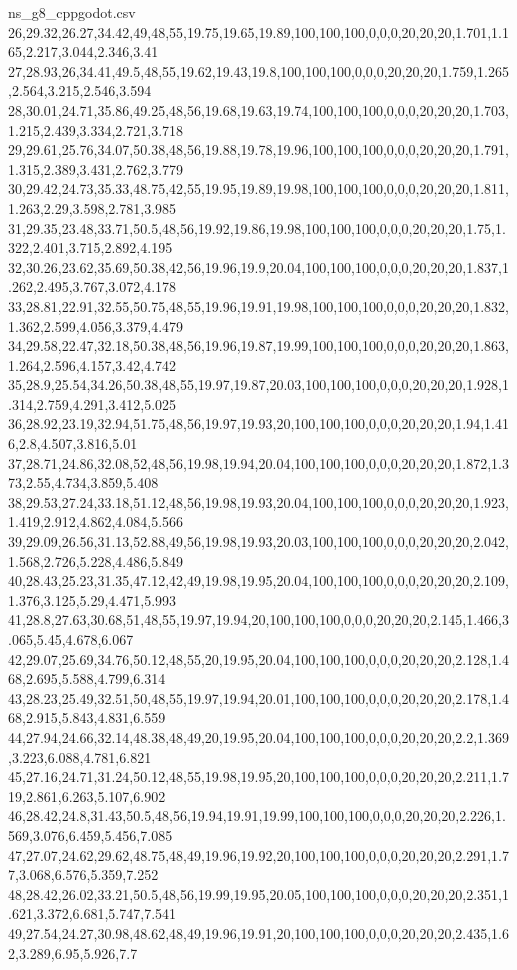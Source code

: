 \begin{filecontents*}[overwrite]{ns_g8_cppgodot.csv}
26,29.32,26.27,34.42,49,48,55,19.75,19.65,19.89,100,100,100,0,0,0,20,20,20,1.701,1.165,2.217,3.044,2.346,3.41
27,28.93,26,34.41,49.5,48,55,19.62,19.43,19.8,100,100,100,0,0,0,20,20,20,1.759,1.265,2.564,3.215,2.546,3.594
28,30.01,24.71,35.86,49.25,48,56,19.68,19.63,19.74,100,100,100,0,0,0,20,20,20,1.703,1.215,2.439,3.334,2.721,3.718
29,29.61,25.76,34.07,50.38,48,56,19.88,19.78,19.96,100,100,100,0,0,0,20,20,20,1.791,1.315,2.389,3.431,2.762,3.779
30,29.42,24.73,35.33,48.75,42,55,19.95,19.89,19.98,100,100,100,0,0,0,20,20,20,1.811,1.263,2.29,3.598,2.781,3.985
31,29.35,23.48,33.71,50.5,48,56,19.92,19.86,19.98,100,100,100,0,0,0,20,20,20,1.75,1.322,2.401,3.715,2.892,4.195
32,30.26,23.62,35.69,50.38,42,56,19.96,19.9,20.04,100,100,100,0,0,0,20,20,20,1.837,1.262,2.495,3.767,3.072,4.178
33,28.81,22.91,32.55,50.75,48,55,19.96,19.91,19.98,100,100,100,0,0,0,20,20,20,1.832,1.362,2.599,4.056,3.379,4.479
34,29.58,22.47,32.18,50.38,48,56,19.96,19.87,19.99,100,100,100,0,0,0,20,20,20,1.863,1.264,2.596,4.157,3.42,4.742
35,28.9,25.54,34.26,50.38,48,55,19.97,19.87,20.03,100,100,100,0,0,0,20,20,20,1.928,1.314,2.759,4.291,3.412,5.025
36,28.92,23.19,32.94,51.75,48,56,19.97,19.93,20,100,100,100,0,0,0,20,20,20,1.94,1.416,2.8,4.507,3.816,5.01
37,28.71,24.86,32.08,52,48,56,19.98,19.94,20.04,100,100,100,0,0,0,20,20,20,1.872,1.373,2.55,4.734,3.859,5.408
38,29.53,27.24,33.18,51.12,48,56,19.98,19.93,20.04,100,100,100,0,0,0,20,20,20,1.923,1.419,2.912,4.862,4.084,5.566
39,29.09,26.56,31.13,52.88,49,56,19.98,19.93,20.03,100,100,100,0,0,0,20,20,20,2.042,1.568,2.726,5.228,4.486,5.849
40,28.43,25.23,31.35,47.12,42,49,19.98,19.95,20.04,100,100,100,0,0,0,20,20,20,2.109,1.376,3.125,5.29,4.471,5.993
41,28.8,27.63,30.68,51,48,55,19.97,19.94,20,100,100,100,0,0,0,20,20,20,2.145,1.466,3.065,5.45,4.678,6.067
42,29.07,25.69,34.76,50.12,48,55,20,19.95,20.04,100,100,100,0,0,0,20,20,20,2.128,1.468,2.695,5.588,4.799,6.314
43,28.23,25.49,32.51,50,48,55,19.97,19.94,20.01,100,100,100,0,0,0,20,20,20,2.178,1.468,2.915,5.843,4.831,6.559
44,27.94,24.66,32.14,48.38,48,49,20,19.95,20.04,100,100,100,0,0,0,20,20,20,2.2,1.369,3.223,6.088,4.781,6.821
45,27.16,24.71,31.24,50.12,48,55,19.98,19.95,20,100,100,100,0,0,0,20,20,20,2.211,1.719,2.861,6.263,5.107,6.902
46,28.42,24.8,31.43,50.5,48,56,19.94,19.91,19.99,100,100,100,0,0,0,20,20,20,2.226,1.569,3.076,6.459,5.456,7.085
47,27.07,24.62,29.62,48.75,48,49,19.96,19.92,20,100,100,100,0,0,0,20,20,20,2.291,1.77,3.068,6.576,5.359,7.252
48,28.42,26.02,33.21,50.5,48,56,19.99,19.95,20.05,100,100,100,0,0,0,20,20,20,2.351,1.621,3.372,6.681,5.747,7.541
49,27.54,24.27,30.98,48.62,48,49,19.96,19.91,20,100,100,100,0,0,0,20,20,20,2.435,1.62,3.289,6.95,5.926,7.7

\end{filecontents*}
